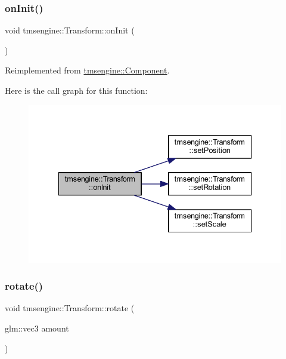 \mbox{\label{classtmsengine_1_1_transform_a761046214917103b7286e36cde981c00}} 
\subsubsection{\texorpdfstring{on\+Init()}{onInit()}}
{\footnotesize\ttfamily void tmsengine\+::\+Transform\+::on\+Init (\begin{DoxyParamCaption}{ }\end{DoxyParamCaption})\hspace{0.3cm}{\ttfamily [virtual]}}



Reimplemented from \hyperlink{classtmsengine_1_1_component_ae992e9b0c98b569eba13d0274089bc18}{tmsengine\+::\+Component}.

Here is the call graph for this function\+:\nopagebreak
\begin{figure}[H]
\begin{center}
\leavevmode
\includegraphics[width=336pt]{classtmsengine_1_1_transform_a761046214917103b7286e36cde981c00_cgraph}
\end{center}
\end{figure}
\mbox{\label{classtmsengine_1_1_transform_a4252393f36c4dac7665366dc6d046b2c}} 
\subsubsection{\texorpdfstring{rotate()}{rotate()}}
{\footnotesize\ttfamily void tmsengine\+::\+Transform\+::rotate (\begin{DoxyParamCaption}\item[{glm\+::vec3}]{amount }\end{DoxyParamCaption})}

